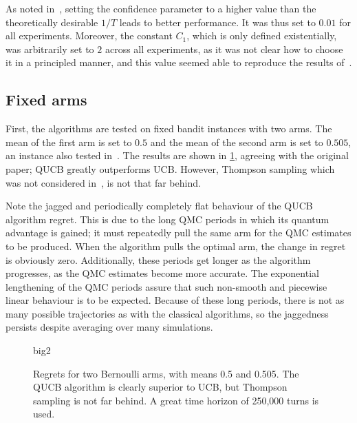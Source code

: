 As noted in~\autocite{wan2022}, setting the confidence parameter to a higher value than the theoretically desirable $1/T$ leads to better performance.
It was thus set to $0.01$ for all experiments.
Moreover, the constant $C_1$, which is only defined existentially, was arbitrarily set to $2$ across all experiments, as it was not clear how to choose it in a principled manner, and this value seemed able to reproduce the results of~\autocite{wan2022}.

\subsection{Fixed arms}
\label{sec:sim_fixed_arms}
First, the algorithms are tested on fixed bandit instances with two arms.
The mean of the first arm is set to $0.5$ and the mean of the second arm is set to $0.505$, an instance also tested in~\autocite{wan2022}.
The results are shown in \cref{fig:big2}, agreeing with the original paper; QUCB greatly outperforms UCB.
However, Thompson sampling which was not considered in~\autocite{wan2022}, is not that far behind.

Note the jagged and periodically completely flat behaviour of the QUCB algorithm regret.
This is due to the long QMC periods in which its quantum advantage is gained; it must repeatedly pull the same arm for the QMC estimates to be produced.
When the algorithm pulls the optimal arm, the change in regret is obviously zero.
Additionally, these periods get longer as the algorithm progresses, as the QMC estimates become more accurate.
The exponential lengthening of the QMC periods assure that such non-smooth and piecewise linear behaviour is to be expected.
Because of these long periods, there is not as many possible trajectories as with the classical algorithms, so the jaggedness persists despite averaging over many simulations.

\begin{figure}
    \centering
    \newcommand{\myoptions}{
        width=10cm,
        height=8cm,
        xlabel={Kiloturn},
        ylabel={Regret},
        legend entries={UCB, QUCB, Thompson},
        legend pos=north west,
        legend cell align=left,
        mystyle,
    }
    {big2}
    \caption[
        Regrets for two Bernoulli arms, with means 0.5 and 0.505.
    ]{
        Regrets for two Bernoulli arms, with means 0.5 and 0.505.
        The QUCB algorithm is clearly superior to UCB, but Thompson sampling is not far behind.
        A great time horizon of 250,000 turns is used.
    }
    \label{fig:big2}
\end{figure}

